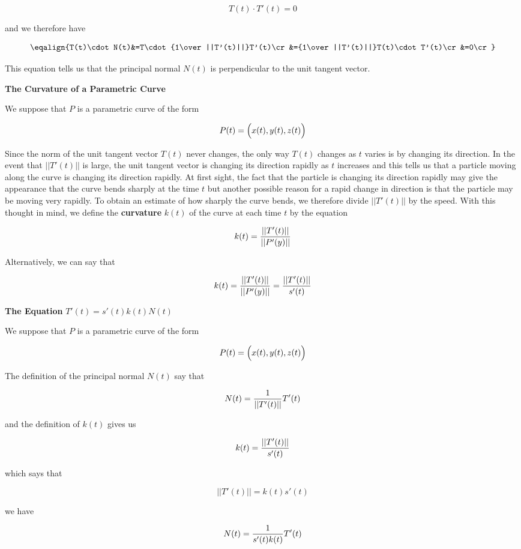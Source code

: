 $$T(t)\cdot T'(t)=0$$

and we therefore have

$$\eqalign{T(t)\cdot N(t)&=T\cdot{1\over ||T'(t)||}T'(t)\cr
		&={1\over ||T'(t)||}T(t)\cdot T'(t)\cr
		&=0\cr}$$

This equation tells us that the principal normal $N(t)$ is perpendicular to the unit tangent vector.

\filbreak
\vskip 1cm
{\bf The Curvature of a Parametric Curve}

\vskip 1mm
We suppose that $P$ is a parametric curve of the form

$$P(t)=\Bigl(x(t),y(t),z(t)\Bigr)$$

Since the norm of the unit tangent vector $T(t)$ never changes, the only way $T(t)$ changes as $t$ varies is by changing its direction. In the event that $||T'(t)||$ is large, the unit tangent vector is changing its direction rapidly as $t$ increases and this tells us that a particle moving along the curve is changing its direction rapidly. At first sight, the fact that the particle is changing its direction rapidly may give the appearance that the curve bends sharply at the time $t$ but another possible reason for a rapid change in direction is that the particle may be moving very rapidly. To obtain an estimate of how sharply the curve bends, we therefore divide $||T'(t)||$ by the speed. With this thought in mind, we define the {\bf curvature} $k(t)$ of the curve at each time $t$ by the equation

$$k(t)={||T'(t)||\over ||P'(y)||}$$

Alternatively, we can say that

$$k(t)={||T'(t)||\over ||P'(y)||}={||T'(t)||\over s'(t)}$$

\filbreak
\vskip 1cm
{\bf The Equation} $T'(t)=s'(t)k(t)N(t)$

\vskip 1mm
We suppose that $P$ is a parametric curve of the form

$$P(t)=\Bigl(x(t),y(t),z(t)\Bigr)$$

The definition of the principal normal $N(t)$ say that

$$N(t)={1\over ||T'(t)||}T'(t)$$

and the definition of $k(t)$ gives us

$$k(t)={||T'(t)||\over s'(t)}$$

which says that

$$||T'(t)||=k(t)s'(t)$$

we have

$$N(t)={1\over s'(t)k(t)}T'(t)$$

